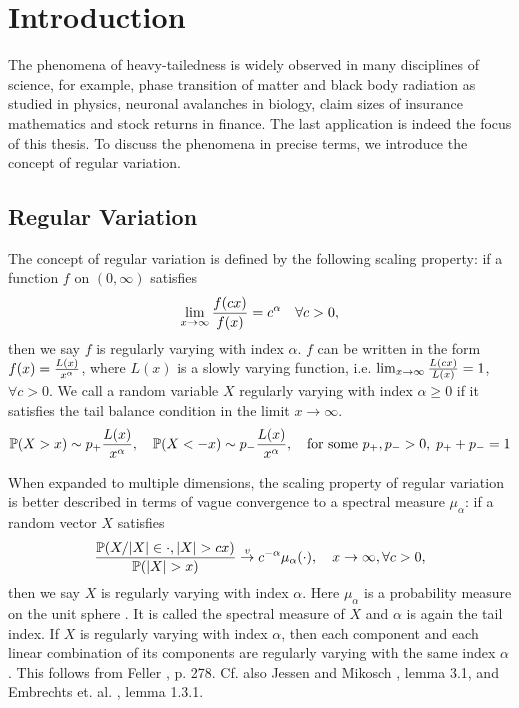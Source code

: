 \chapter{Introduction}\label{ch:intr}
The phenomena of heavy-tailedness is widely observed in many
disciplines of science, for example, phase transition of matter and
black body radiation as studied in physics, neuronal avalanches in
biology, claim sizes of insurance mathematics and stock returns in
finance. The last application is indeed the focus of this thesis. To
discuss the phenomena in precise terms, we introduce the concept of
regular variation.

\section{Regular Variation}\label{sec:intro_regvar}
The concept of regular variation is defined by the following scaling
property: if a function $f$ on $(0, \infty)$ satisfies
\[
\lim_{x \to \infty} {f(c x) \over f(x)} = c^\alpha
\quad
\forall c > 0,
\]
then we say $f$ is regularly varying with index $\alpha$.
$f$ can be written in the form $f(x) = {L(x) \over x^\alpha}$, where
$L(x)$ is a slowly varying function, i.e.
$\lim_{x \to \infty} {L(c x) \over L(x)} = 1$, $\forall c > 0$.
We call a random variable $X$ regularly varying with index
$\alpha \geq 0$ if it satisfies the tail balance condition in the
limit $x \to \infty$.
\[
\P(X > x) \sim p_+ {L(x) \over x^\alpha},\quad
\P(X < -x) \sim p_- {L(x) \over x^\alpha}, \quad
\text{for some } p_+, p_- > 0,\; p_+ + p_- = 1
\]

When expanded to multiple dimensions, the scaling property of regular
variation is better described in terms of vague convergence to a
spectral measure $\mu_\alpha$: if a random vector $X$ satisfies
\[
{
  \P(X/|X| \in \cdot, |X| > c x)
  \over
  \P(|X| > x)
}
\overset{v}{\to} c^{-\alpha} \mu_\alpha(\cdot),
\quad
x \to \infty, \forall c > 0,
\]
then we say $X$ is regularly varying with index $\alpha$. Here
$\mu_\alpha$ is a probability measure on the unit sphere
\cite{buraczewski:damek:mikosch:2016}. It is called the spectral 
measure of $X$ and $\alpha$ is again the tail index.
If $X$ is regularly varying with index $\alpha$, then each component
and each linear combination of its components are regularly
varying with the same index $\alpha$. This follows from Feller
\cite{feller}, p. 278. Cf. also Jessen and Mikosch
\cite{JessenMikosch2006}, lemma 3.1, and Embrechts et. al.
\cite{embrechts:klueppelberg:mikosch:1997}, lemma 1.3.1.

